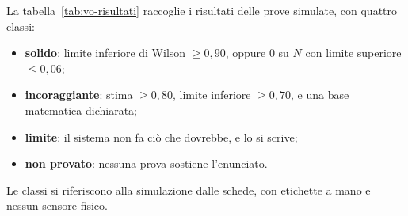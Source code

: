 La tabella~\ref{tab:vo-risultati} raccoglie i risultati delle prove simulate, con quattro classi:
\begin{itemize}
\item \textbf{solido}: limite inferiore di Wilson $\ge0{,}90$, oppure 0 su $N$ con limite superiore $\le0{,}06$;
\item \textbf{incoraggiante}: stima $\ge0{,}80$, limite inferiore $\ge0{,}70$, e una base matematica dichiarata;
\item \textbf{limite}: il sistema non fa ciò che dovrebbe, e lo si scrive;
\item \textbf{non provato}: nessuna prova sostiene l'enunciato.
\end{itemize}
Le classi si riferiscono alla simulazione dalle schede, con etichette a mano e nessun sensore fisico.

